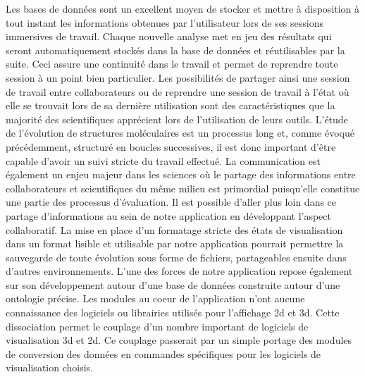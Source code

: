 Les bases de données sont un excellent moyen de stocker et mettre à disposition à tout instant les informations obtenues par l'utilisateur lors de ses sessions immersives de travail. Chaque nouvelle analyse met en jeu des résultats qui seront automatiquement stockés dans la base de données et réutilisables par la suite. Ceci assure une continuité dans le travail et permet de reprendre toute session à un point bien particulier. Les possibilités de partager ainsi une session de travail entre collaborateurs ou de reprendre une session de travail à l'état où elle se trouvait lors de sa dernière utilisation sont des caractéristiques que la majorité des scientifiques apprécient lors de l'utilisation de leurs outils. L'étude de l'évolution de structures moléculaires est un processus long et, comme évoqué précédemment, structuré en boucles successives, il est donc important d'être capable d'avoir un suivi stricte du travail effectué. La communication est également un enjeu majeur dans les sciences où le partage des informations entre collaborateurs et scientifiques du même milieu est primordial puisqu'elle constitue une partie des processus d'évaluation. Il est possible d'aller plus loin dans ce partage d'informations au sein de notre application en développant l'aspect collaboratif. La mise en place d'un formatage stricte des états de visualisation dans un format lisible et utilisable par notre application pourrait permettre la sauvegarde de toute évolution sous forme de fichiers, partageables ensuite dans d'autres environnements. L'une des forces de notre application repose également sur son développement autour d'une base de données construite autour d'une ontologie précise. Les modules au coeur de l'application n'ont aucune connaissance des logiciels ou librairies utilisés pour l'affichage 2d et 3d. Cette dissociation permet le couplage d'un nombre important de logiciels de visualisation 3d et 2d. Ce couplage passerait par un simple portage des modules de conversion des données en commandes spécifiques pour les logiciels de visualisation choisis.


